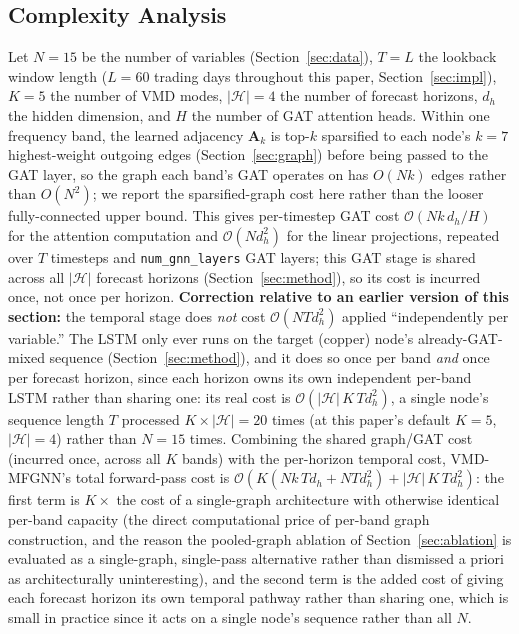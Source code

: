 \documentclass[journal]{IEEEtran}
\begin{document}
\subsection{Complexity Analysis}
\label{sec:complexity}

Let $N=15$ be the number of variables (Section~\ref{sec:data}), $T=L$ the lookback window length ($L=60$ trading days throughout this paper, Section~\ref{sec:impl}), $K=5$ the number of VMD modes, $|\mathcal{H}|=4$ the number of forecast horizons, $d_h$ the hidden dimension, and $H$ the number of GAT attention heads. Within one frequency band, the learned adjacency $\mathbf{A}_k$ is top-$k$ sparsified to each node's $k=7$ highest-weight outgoing edges (Section~\ref{sec:graph}) before being passed to the GAT layer, so the graph each band's GAT operates on has $O(Nk)$ edges rather than $O(N^2)$; we report the sparsified-graph cost here rather than the looser fully-connected upper bound. This gives per-timestep GAT cost $\mathcal{O}(Nk\,d_h/H)$ for the attention computation and $\mathcal{O}(N d_h^2)$ for the linear projections, repeated over $T$ timesteps and \texttt{num\_gnn\_layers} GAT layers; this GAT stage is shared across all $|\mathcal{H}|$ forecast horizons (Section~\ref{sec:method}), so its cost is incurred once, not once per horizon. \textbf{Correction relative to an earlier version of this section:} the temporal stage does \emph{not} cost $\mathcal{O}(NTd_h^2)$ applied ``independently per variable.'' The LSTM only ever runs on the target (copper) node's already-GAT-mixed sequence (Section~\ref{sec:method}), and it does so once per band \emph{and} once per forecast horizon, since each horizon owns its own independent per-band LSTM rather than sharing one: its real cost is $\mathcal{O}(|\mathcal{H}|\,K\,T d_h^2)$, a single node's sequence length $T$ processed $K \times |\mathcal{H}| = 20$ times (at this paper's default $K=5$, $|\mathcal{H}|=4$) rather than $N=15$ times. Combining the shared graph/GAT cost (incurred once, across all $K$ bands) with the per-horizon temporal cost, VMD-MFGNN's total forward-pass cost is $\mathcal{O}\!\left(K(Nk\,T d_h + N T d_h^2) + |\mathcal{H}|\,K\,T d_h^2\right)$: the first term is $K\times$ the cost of a single-graph architecture with otherwise identical per-band capacity (the direct computational price of per-band graph construction, and the reason the pooled-graph ablation of Section~\ref{sec:ablation} is evaluated as a single-graph, single-pass alternative rather than dismissed a priori as architecturally uninteresting), and the second term is the added cost of giving each forecast horizon its own temporal pathway rather than sharing one, which is small in practice since it acts on a single node's sequence rather than all $N$.
\end{document}
